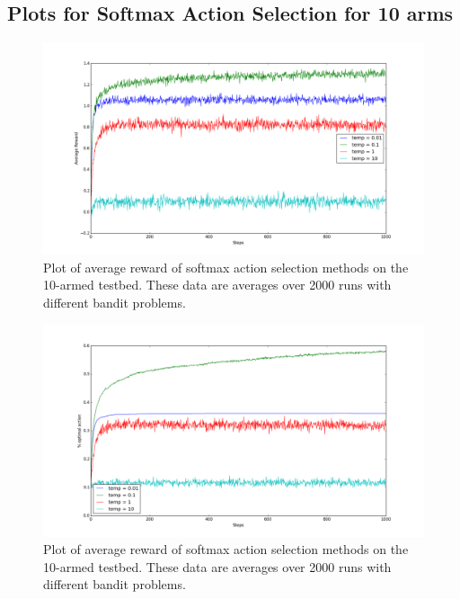 \documentclass[english]{article}
\begin{document}
\subsection{Plots for Softmax Action Selection for 10 arms}
\begin{figure}[H]
  \includegraphics[width=\linewidth]{softmax_average_reward.png}
  \caption{Plot of average reward of softmax action selection methods on the 10-armed testbed. These data are averages over 2000 runs with different bandit problems.}
  \label{fig:eg1}
\end{figure}

\begin{figure}[H]
  \includegraphics[width=\linewidth]{softmax_optimal_action.png}
  \caption{Plot of average reward of softmax action selection methods on the 10-armed testbed. These data are averages over 2000 runs with different bandit problems.}
  \label{fig:eg1}
\end{figure}
\end{document}
